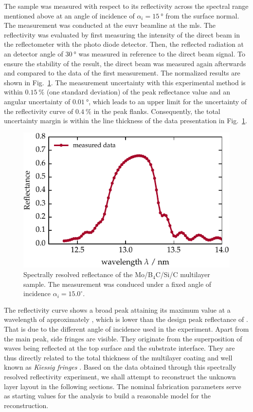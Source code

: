 The sample was measured with respect to its reflectivity across the spectral range mentioned above at an angle of incidence of $\alpha_i=\SI{15}{\degree}$ from the surface normal. The measurement was conducted at the \gls{euvr} beamline at the \gls{mls}. The reflectivity was evaluated by first measuring the intensity of the direct beam in the reflectometer with the photo diode detector. Then, the reflected radiation at an detector angle of $\SI{30}{\degree}$ was measured in reference to the direct beam signal. To ensure the stability of the result, the direct beam was measured again afterwards and compared to the data of the first measurement. The normalized results are shown in Fig.~\ref{ch_spec:fig_ptb17_reflectance_AOI_15}. The measurement uncertainty with this experimental method is within $\SI{0.15}{\percent}$ (one standard deviation) of the peak reflectance value \cite{scholze_high-accuracy_2003} and an angular uncertainty of $\SI{0.01}{\degree}$, which leads to an upper limit for the uncertainty of the reflectivity curve of $\SI{0.4}{\percent}$ in the peak flanks. Consequently, the total uncertainty margin is within the line thickness of the data presentation in Fig.~\ref{ch_spec:fig_ptb17_reflectance_AOI_15}.
\begin{figure}[htbp]
\centering
\includegraphics{img/PTB17_reflectance_AOI_15}
\caption{Spectrally resolved reflectance of the Mo/B$_4$C/Si/C multilayer sample. The measurement was conduced under a fixed angle of incidence $\alpha_i = 15.0^\circ$.}
\label{ch_spec:fig_ptb17_reflectance_AOI_15}
\end{figure}

The reflectivity curve shows a broad peak attaining its maximum value at a wavelength of approximately , which is lower than the design peak reflectance of . That is due to the different angle of incidence used in the experiment. Apart from the main peak, side fringes are visible. They originate from the superposition of waves being reflected at the top surface and the substrate interface. They are thus directly related to the total thickness of the multilayer coating and well known as \emph{Kiessig fringes} \cite{kiessig_interferenz_1931}. Based on the data obtained through this spectrally resolved reflectivity experiment, we shall attempt to reconstruct the unknown layer layout in the following sections. The nominal fabrication parameters serve as starting values for the analysis to build a reasonable model for the reconstruction.

